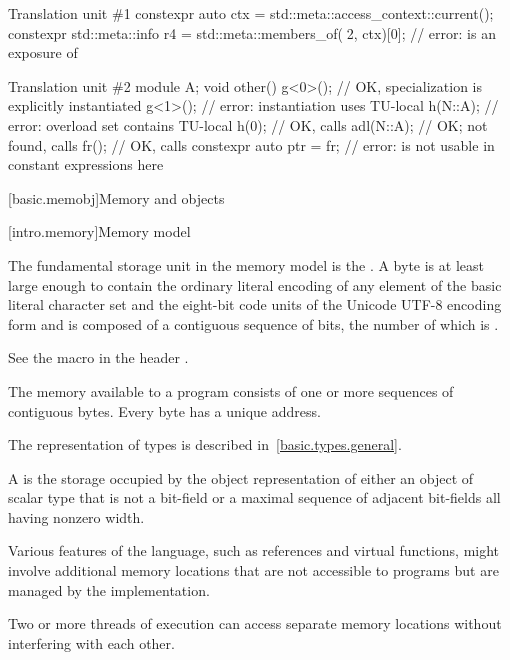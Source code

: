 \begin{example}
\begin{codeblocktu}{Translation unit \#1}
constexpr auto ctx = std::meta::access_context::current();
constexpr std::meta::info r4 =
  std::meta::members_of(^^N2, ctx)[0];              // error:  is an exposure of 
\end{codeblocktu}
\begin{codeblocktu}{Translation unit \#2}
module A;
void other() {
  g<0>();                           // OK, specialization is explicitly instantiated
  g<1>();                           // error: instantiation uses TU-local 
  h(N::A{});                        // error: overload set contains TU-local 
  h(0);                             // OK, calls 
  adl(N::A{});                      // OK;  not found, calls 
  fr();                             // OK, calls 
  constexpr auto ptr = fr;          // error:  is not usable in constant expressions here
}
\end{codeblocktu}
\end{example}

[basic.memobj]{Memory and objects}

[intro.memory]{Memory model}

\pnum
{}%
The fundamental storage unit in the \Cpp{} memory model is the
.
A byte is at least large enough to contain
the ordinary literal encoding of any element of the basic
%
literal character set
and the eight-bit code units of the Unicode
%
UTF-8 encoding form
and is composed of a contiguous sequence of
bits,
the number of which is .
\begin{note}
See the macro  in the header .
\end{note}
The memory available to a \Cpp{} program consists of one or more sequences of
contiguous bytes.
Every byte has a unique address.

\pnum
\begin{note}
The representation of types is described
in~\ref{basic.types.general}.
\end{note}

\pnum
A  is
the storage occupied by the object representation of
either an object of scalar type that is not a bit-field
or a maximal sequence of adjacent bit-fields all having nonzero width.
\begin{note}
Various
features of the language, such as references and virtual functions, might
involve additional memory locations that are not accessible to programs but are
managed by the implementation.
\end{note}
Two or more threads of
execution can access separate memory
locations without interfering with each other.

